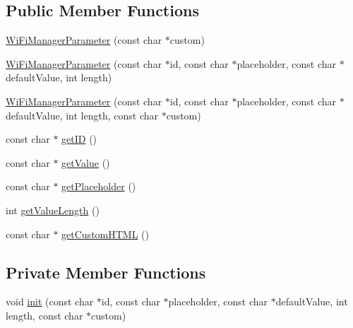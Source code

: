 \subsection*{Public Member Functions}
\begin{DoxyCompactItemize}
\item 
\hyperlink{class_wi_fi_manager_parameter_a6e9da46ea712de5d61449098414a3b66}{Wi\+Fi\+Manager\+Parameter} (const char $\ast$custom)
\item 
\hyperlink{class_wi_fi_manager_parameter_a8e55ac907530d04ab60d30045e1382a1}{Wi\+Fi\+Manager\+Parameter} (const char $\ast$id, const char $\ast$placeholder, const char $\ast$default\+Value, int length)
\item 
\hyperlink{class_wi_fi_manager_parameter_a45967e1d29d52f5fc8e47e99cb693b98}{Wi\+Fi\+Manager\+Parameter} (const char $\ast$id, const char $\ast$placeholder, const char $\ast$default\+Value, int length, const char $\ast$custom)
\item 
const char $\ast$ \hyperlink{class_wi_fi_manager_parameter_af57919615418fff788310ba9cc2664d8}{get\+ID} ()
\item 
const char $\ast$ \hyperlink{class_wi_fi_manager_parameter_a23d23709f466ef1c3c2535a39016ec0f}{get\+Value} ()
\item 
const char $\ast$ \hyperlink{class_wi_fi_manager_parameter_a69124c6f46876d1ede54177c692e3382}{get\+Placeholder} ()
\item 
int \hyperlink{class_wi_fi_manager_parameter_a51715af23f9c067a73cc45fab7953606}{get\+Value\+Length} ()
\item 
const char $\ast$ \hyperlink{class_wi_fi_manager_parameter_a596273c189eb40107500cee3ad31b13b}{get\+Custom\+H\+T\+ML} ()
\end{DoxyCompactItemize}
\subsection*{Private Member Functions}
\begin{DoxyCompactItemize}
\item 
void \hyperlink{class_wi_fi_manager_parameter_a137b764027d3851a428f3ab185a5660f}{init} (const char $\ast$id, const char $\ast$placeholder, const char $\ast$default\+Value, int length, const char $\ast$custom)
\end{DoxyCompactItemize}
